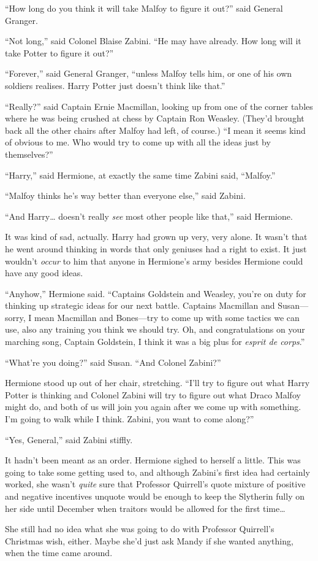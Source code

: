 ``How long do you think it will take Malfoy to figure it out?'' said
General Granger.

``Not long,'' said Colonel Blaise Zabini. ``He may have already. How
long will it take Potter to figure it out?''

``Forever,'' said General Granger, ``unless Malfoy tells him, or one of
his own soldiers realises. Harry Potter just doesn't think like that.''

``Really?'' said Captain Ernie Macmillan, looking up from one of the
corner tables where he was being crushed at chess by Captain Ron
Weasley. (They'd brought back all the other chairs after Malfoy had
left, of course.) ``I mean it seems kind of obvious to me. Who would try
to come up with all the ideas just by themselves?''

``Harry,'' said Hermione, at exactly the same time Zabini said,
``Malfoy.''

``Malfoy thinks he's way better than everyone else,'' said Zabini.

``And Harry\ldots{} doesn't really \emph{see} most other people like
that,'' said Hermione.

It was kind of sad, actually. Harry had grown up very, very alone. It
wasn't that he went around thinking in words that only geniuses had a
right to exist. It just wouldn't \emph{occur} to him that anyone in
Hermione's army besides Hermione could have any good ideas.

``Anyhow,'' Hermione said. ``Captains Goldstein and Weasley, you're on
duty for thinking up strategic ideas for our next battle. Captains
Macmillan and Susan---sorry, I mean Macmillan and Bones---try to come up
with some tactics we can use, also any training you think we should try.
Oh, and congratulations on your marching song, Captain Goldstein, I
think it was a big plus for \emph{esprit de corps}.''

``What're you doing?'' said Susan. ``And Colonel Zabini?''

Hermione stood up out of her chair, stretching. ``I'll try to figure out
what Harry Potter is thinking and Colonel Zabini will try to figure out
what Draco Malfoy might do, and both of us will join you again after we
come up with something. I'm going to walk while I think. Zabini, you
want to come along?''

``Yes, General,'' said Zabini stiffly.

It hadn't been meant as an order. Hermione sighed to herself a little.
This was going to take some getting used to, and although Zabini's first
idea had certainly worked, she wasn't \emph{quite} sure that Professor
Quirrell's quote mixture of positive and negative incentives unquote
would be enough to keep the Slytherin fully on her side until December
when traitors would be allowed for the first time\ldots{}

She still had no idea what she was going to do with Professor Quirrell's
Christmas wish, either. Maybe she'd just ask Mandy if she wanted
anything, when the time came around.
